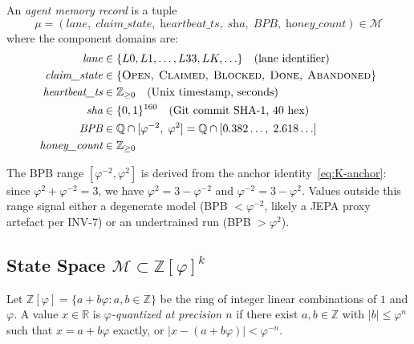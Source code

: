\begin{definition}
\label{def:K-agent-record}
An \emph{agent memory record} is a tuple
\[
  \mu = (\textit{lane},\;
         \textit{claim\_state},\;
         \textit{heartbeat\_ts},\;
         \textit{sha},\;
         \textit{BPB},\;
         \textit{honey\_count})
  \in \mathcal{M}
\]
where the component domains are:
\begin{align*}
  \textit{lane}         &\in \{L0, L1, \ldots, L33, LK, \ldots\}
                              \quad \text{(lane identifier)} \\
  \textit{claim\_state} &\in \{\textsc{Open},\; \textsc{Claimed},\;
                              \textsc{Blocked},\; \textsc{Done},\;
                              \textsc{Abandoned}\} \\
  \textit{heartbeat\_ts}&\in \mathbb{Z}_{\geq 0}
                              \quad \text{(Unix timestamp, seconds)} \\
  \textit{sha}          &\in \{0,1\}^{160}
                              \quad \text{(Git commit SHA-1, 40 hex)} \\
  \textit{BPB}          &\in \mathbb{Q} \cap [\varphi^{-2},\; \varphi^{2}]
                              = \mathbb{Q} \cap [0.382\ldots,\; 2.618\ldots] \\
  \textit{honey\_count} &\in \mathbb{Z}_{\geq 0}
\end{align*}
\end{definition}

The BPB range $[\varphi^{-2}, \varphi^{2}]$ is derived from the anchor
identity~\eqref{eq:K-anchor}: since $\varphi^{2} + \varphi^{-2} = 3$,
we have $\varphi^{2} = 3 - \varphi^{-2}$ and
$\varphi^{-2} = 3 - \varphi^{2}$. Values outside this range signal
either a degenerate model (BPB $<\varphi^{-2}$, likely a JEPA proxy
artefact per INV-7) or an undertrained run (BPB $>\varphi^{2}$).

\subsection{State Space $\mathcal{M} \subset \mathbb{Z}[\varphi]^{k}$}
\label{ssec:K-state-space}

\begin{definition}
\label{def:K-phi-quantization}
Let $\mathbb{Z}[\varphi] = \{a + b\varphi : a, b \in \mathbb{Z}\}$ be
the ring of integer linear combinations of $1$ and $\varphi$. A value
$x \in \mathbb{R}$ is \emph{$\varphi$-quantized at precision $n$} if
there exist $a, b \in \mathbb{Z}$ with $|b| \leq \varphi^{n}$ such that
$x = a + b\varphi$ exactly, or $|x - (a+b\varphi)| < \varphi^{-n}$.
\end{definition}

